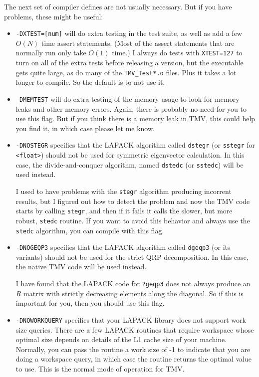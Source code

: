 \documentclass[twoside,letterpaper,11pt]{article}
\renewcommand{\tt}[1]{{\lstinline {#1}}}
\begin{document}
The next set of compiler defines are not usually necessary.  But
if you have problems, these might be useful:
\begin{itemize}
\item
\texttt{-DXTEST=[num]} will do extra testing in the test suite, as well as add a few $O(N)$
time assert statements.  (Most of the assert statements that are normally run only take
$O(1)$ time.)  I always do tests with \tt{XTEST=127} to turn on all of the extra tests
before releasing a version, but the
executable gets quite large, as do many of the \texttt{TMV\_Test*.o} files.  Plus it takes
a lot longer to compile.  So the default is to not use it.  

\item
\texttt{-DMEMTEST} will do extra testing of the memory usage to look for memory leaks
and other memory errors.  Again, there is probably no need for you to use this
flag.  But if you think there is a memory leak in TMV, this could help you find it, 
in which case please let me know.

\item
\texttt{-DNOSTEGR} specifies that the LAPACK algorithm called
\tt{dstegr} (or \tt{sstegr} for \tt{<float>}) should not be used for symmetric
eigenvector calculation.  In this case, the divide-and-conquer algorithm,
named \tt{dstedc} (or \tt{sstedc}) will be used instead.

I used to have problems with the \tt{stegr} algorithm producing incorrent
results, but I figured out how to detect the problem and now
the TMV code starts by calling \tt{stegr}, and then if it fails it calls
the slower, but more robust, \tt{stedc} routine.
If you want to avoid this behavior and always use the \tt{stedc} algorithm,
you can compile with this flag.
\item
\texttt{-DNOGEQP3} specifies that the LAPACK algorithm called
\tt{dgeqp3} (or its variants) should not be used for the strict QRP decomposition.
In this case, the native TMV code will be used instead.

I have found that the LAPACK code for \tt{?geqp3} does not always
produce an $R$ matrix
with strictly decreasing elements along the diagonal.  So if this is important
for you, then you should use this flag.
\item
{}
\texttt{-DNOWORKQUERY} specifies that your LAPACK library does not support
work size queries.  There are a few LAPACK routines that require workspace whose
optimal size depends on details of the L1 cache size of your machine.  Normally,
you can pass the routine a work size of -1 to indicate that you are doing a workspace
query, in which case the routine returns the optimal value to use.  This is the normal
mode of operation for TMV.  


\end{itemize}
\end{document}
